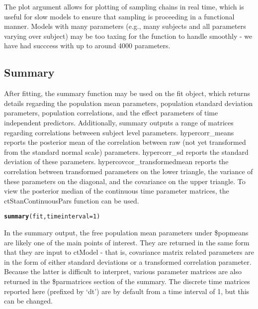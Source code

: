 \documentclass[nojss]{jss}\usepackage[]{graphicx}\usepackage[]{color}
\makeatletter
\newcommand{\hlnum}[1]{\textcolor[rgb]{0.686,0.059,0.569}{#1}}%
\newcommand{\hlstd}[1]{\textcolor[rgb]{0.345,0.345,0.345}{#1}}%
\newcommand{\hlkwc}[1]{\textcolor[rgb]{0.333,0.667,0.333}{#1}}%
\newcommand{\hlkwd}[1]{\textcolor[rgb]{0.737,0.353,0.396}{\textbf{#1}}}%
\newenvironment{kframe}{%
 \def\at@end@of@kframe{}%
 \ifinner\ifhmode%
  \def\at@end@of@kframe{\end{minipage}}%
  \begin{minipage}{\columnwidth}%
 \fi\fi%
 \def\FrameCommand##1{\hskip\@totalleftmargin \hskip-\fboxsep
 \colorbox{shadecolor}{##1}\hskip-\fboxsep
     \hskip-\linewidth \hskip-\@totalleftmargin \hskip\columnwidth}%
 \MakeFramed {\advance\hsize-\width
   \@totalleftmargin\z@ \linewidth\hsize
   \@setminipage}}%
 {\par\unskip\endMakeFramed%
 \at@end@of@kframe}
\newenvironment{knitrout}{}{} %
\makeatother
\begin{document}
The plot argument allows for plotting of sampling chains in real time, which is useful for slow models to ensure that sampling is proceeding in a functional manner. Models with many parameters (e.g., many subjects and all parameters varying over subject) may be too taxing for the function to handle smoothly - we have had succcess with up to around 4000 parameters.  

\subsection{Summary}
After fitting, the summary function may be used on the fit object, which returns details regarding the population mean parameters, population standard deviation parameters, population correlations, and the effect parameters of time independent predictors. 
Additionally, summary outputs a range of matrices regarding correlations betweeen subject level parameters. hypercorr\_means reports the posterior mean of the correlation between raw (not yet transformed from the standard normal scale) parameters. hypercorr\_sd reports the standard deviation of these parameters. hypercovcor\_transformedmean reports the correlation between transformed parameters on the lower triangle, the variance of these parameters on the diagonal, and the covariance on the upper triangle.
To view the posterior median of the continuous time parameter matrices, the ctStanContinuousPars function can be used.

\begin{knitrout}\small
{}\color{fgcolor}\begin{kframe}
\begin{alltt}
\hlkwd{summary}\hlstd{(fit,}\hlkwc{timeinterval} \hlstd{=} \hlnum{1}\hlstd{)}
\end{alltt}
\end{kframe}
\end{knitrout}

In the summary output, the free population mean parameters under \$popmeans are likely one of the main points of interest. They are returned in the same form that they are input to ctModel - that is, covariance matrix related parameters are in the form of either standard deviations or a transformed correlation parameter. Because the latter is difficult to interpret, various parameter matrices are also returned in the \$parmatrices section of the summary. The discrete time matrices reported here (prefixed by `dt') are by default from a time interval of 1, but this can be changed.
\end{document}

